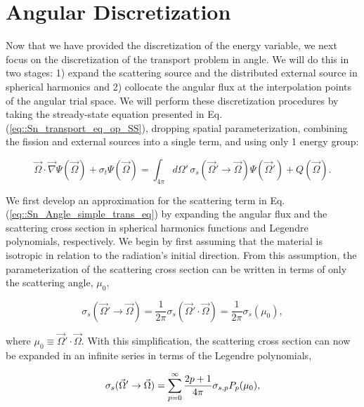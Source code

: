 \section{Angular Discretization}
\label{sec::Sn_Angle}

Now that we have provided the discretization of the energy variable, we next focus on the discretization of the transport problem in angle. We will do this in two stages: 1) expand the scattering source and the distributed external source in spherical harmonics and 2) collocate the angular flux at the interpolation points of the angular trial space. We will perform these discretization procedures by taking the stready-state equation presented in Eq. (\ref{eq::Sn_transport_eq_op_SS}), dropping spatial parameterization, combining the fission and external sources into a single term, and using only 1 energy group:

\begin{equation}
\label{eq::Sn_Angle_simple_trans_eq}
\vec{\Omega} \cdot \vec{\nabla} \Psi (\vec{\Omega}) + \sigma_t \Psi (\vec{\Omega}) = \int_{4 \pi}  d\Omega' \, \sigma_s ( \vec{\Omega}' \rightarrow \vec{\Omega}) \Psi (\vec{\Omega}') + Q  (\vec{\Omega}) .
\end{equation}

We first develop an approximation for the scattering term in Eq. (\ref{eq::Sn_Angle_simple_trans_eq}) by expanding the angular flux and the scattering cross section in spherical harmonics functions and Legendre polynomials, respectively. We begin by first assuming that the material is isotropic in relation to the radiation's initial direction. From this assumption, the parameterization of the scattering cross section can be written in terms of only the scattering angle, $\mu_0$,

\begin{equation}
\label{eq::Sn_scatt_xs}
\sigma_s ( \vec{\Omega}' \rightarrow \vec{\Omega}) = \frac{1}{2 \pi} \sigma_s ( \vec{\Omega}' \cdot \vec{\Omega}) = \frac{1}{2 \pi} \sigma_s ( \mu_0) , 
\end{equation}

\noindent where $\mu_0 \equiv  \vec{\Omega}' \cdot \vec{\Omega}$. With this simplification, the scattering cross section can now be expanded in an infinite series in terms of the Legendre polynomials,

\begin{equation}
\label{eq::Sn_scatt_xs_legendre}
\sigma_s ( \vec{\Omega}' \rightarrow \vec{\Omega}) = \sum\displaylimits_{p=0}^{\infty} \frac{2p + 1}{4 \pi}  \sigma_{s,p} P_p ( \mu_0) , 
\end{equation}

